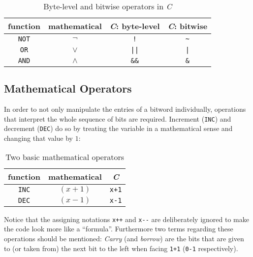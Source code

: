 \begin{table}[h]
\centering
\begin{tabular}{c|c|c|c}
function & mathematical & \emph{C}: byte-level & \emph{C}: bitwise\\
\hline
\lstinline$NOT$ & $\lnot$ & \lstinline$!$ & \lstinline$~$\\
\lstinline$OR$ & $\lor$ & \lstinline$||$ & \lstinline$|$\\
\lstinline$AND$ & $\land$ & \lstinline$&&$ & \lstinline$&$\\
\end{tabular}
\caption{Byte-level and bitwise operators in \emph{C}}
\label{table:operators}
\end{table}


\subsection*{Mathematical Operators}
In order to not only manipulate the entries of a bitword individually,
operations that interpret the whole sequence of bits are required.
Increment (\lstinline$INC$) and decrement (\lstinline$DEC$)
do so by treating the variable in a mathematical sense
and changing that value by $1$:

\begin{table}[h]
\centering
\begin{tabular}{c|c|c}
function & mathematical & \emph{C}\\
\hline
\lstinline$INC$ & $(x+1)$ & \lstinline$x+1$\\
\lstinline$DEC$ & $(x-1)$ & \lstinline$x-1$\\
\end{tabular}
\caption{Two basic mathematical operators}
\label{table:math}
\end{table}

Notice that the assigning notations \lstinline$x++$ and \lstinline$x--$
are deliberately ignored to make the code look more like a ``formula''.
Furthermore two terms regarding these operations should be mentioned:
\emph{Carry} (and \emph{borrow}) are the bits
that are given to (or taken from) the next bit to the left
when facing \lstinline$1+1$ (\lstinline$0-1$ respectively).
